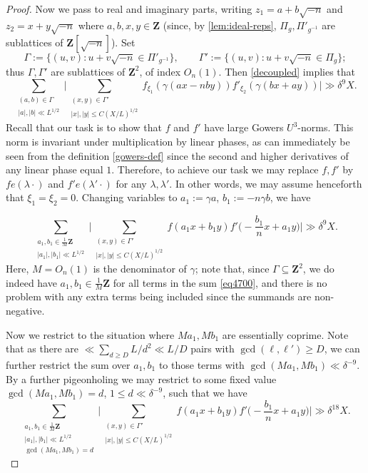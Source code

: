 \documentclass[11pt,reqno]{amsart}
\numberwithin{equation}{section}
\theoremstyle{definition}
\theoremstyle{remark}
\renewcommand{\le}{\leqslant}
\renewcommand{\ge}{\geqslant}
\newcommand\Z{\mathbf{Z}}
\begin{document}
\begin{proof}
Now we pass to real and imaginary parts, writing $z_1 =a + b \sqrt{-n}$ and $z_2 = x + y \sqrt{-n}$ where $a,b,x,y \in \Z$ (since, by \cref{lem:ideal-reps}, $\Pi_g, \Pi'_{g^{-1}}$ are sublattices of $\Z[\sqrt{-n}]$). 
Set
\begin{equation}\label{gammas-def} \Gamma := \{(u,v) : u + v \sqrt{-n} \in \Pi'_{g^{-1}}\}, \qquad \Gamma' := \{(u,v) : u + v \sqrt{-n} \in \Pi_g\};\end{equation}
thus $\Gamma, \Gamma'$ are sublattices of $\Z^2$, of index $O_n(1)$.
Then \cref{decoupled} implies that 
\begin{equation}\label{eq4700} \sum_{ \substack{(a,b) \in \Gamma \\ |a|, |b| \ll L^{1/2}}} \Big|\sum_{\substack{(x,y) \in \Gamma' \\ |x|, |y| \le C(X/L)^{1/2}}} f_{\xi_1}(\gamma(ax - nby)) f'_{\xi_2}(\gamma(bx + ay))   \Big| \gg \delta^9 X.\end{equation}
Recall that our task is to show that $f$ and $f'$ have large Gowers $U^3$-norms. This norm is invariant under multiplication by linear phases, as can immediately be seen from the definition \cref{gowers-def} since the second and higher derivatives of any linear phase equal $1$. Therefore, to achieve our task we may replace $f, f'$ by $f e(\lambda \cdot)$ and $f' e(\lambda' \cdot)$ for any $\lambda, \lambda'$. In other words, we may assume henceforth that $\xi_1 = \xi_2 = 0$. Changing variables to $a_1 := \gamma a$, $b_1 := -n\gamma b$, we have

\begin{equation}\label{eq476}
\sum_{ \substack{a_1,b_1 \in \frac{1}{M}\Z \\ |a_1|, |b_1| \ll L^{1/2}}} \Big|\sum_{\substack{(x,y) \in \Gamma' \\ |x|, |y| \le  C(X/L)^{1/2}}} f(a_1 x + b_1 y) f'\Big(-\frac{b_1}{n} x + a_1 y\Big)   \Big| \gg \delta^9 X.
\end{equation}
Here, $M = O_n(1)$ is the denominator of $\gamma$; note that, since $\Gamma \subseteq\Z^2$, we do indeed have $a_1, b_1 \in \frac{1}{M} \Z$ for all terms in the sum \cref{eq4700}, and there is no problem with any extra terms being included since the summands are non-negative.



Now we restrict to the situation where $Ma_1, Mb_1$ are essentially coprime.
Note that as there are $\ll \sum_{d\ge D}L/d^2\ll L/D$ pairs with $\gcd(\ell,\ell')\ge D$, we can further restrict the sum over $a_1,b_1$ to those terms with $\gcd(Ma_1,Mb_1) \ll \delta^{-9}$. By a further pigeonholing we may restrict to some fixed value $\gcd(Ma_1, Mb_1) = d$, $1 \le d \ll \delta^{-9}$, such that we have
\begin{equation}\label{typei-written-new-2}
\sum_{\substack{a_1, b_1 \in \frac{1}{M}\Z \\ |a_1|, |b_1| \ll L^{1/2} \\ \gcd(Ma_1, Mb_1) = d}} \Big| \sum_{\substack{(x,y) \in \Gamma' \\ |x|, |y| \le C(X/L)^{1/2}}} f(a_1 x + b_1 y) f'\Big(-\frac{b_1}{n} x + a_1 y\Big)\Big| \gg \delta^{18} X.
\end{equation}


\end{proof}
\end{document}
